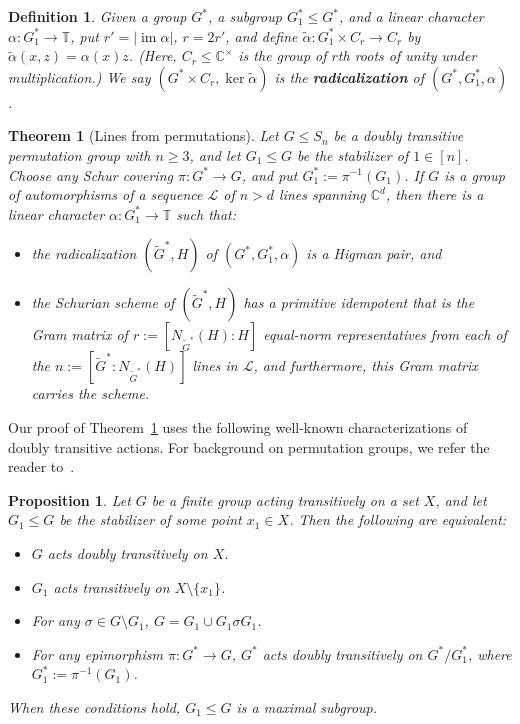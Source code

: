 \documentclass[11pt]{article}
\newtheorem{proposition}[theo]{Proposition}
\newtheorem{definition}[theo]{Definition}
\newtheorem{theorem}[theo]{Theorem}
\theoremstyle{definition}
\numberwithin{equation}{section}
\begin{document}
\begin{definition}
\label{defn:radicalization}
Given a group $G^*$, a subgroup $G^*_1 \leq G^*$, and a linear character $\alpha \colon G_1^* \to \mathbb{T}$, put $r' =|\operatorname{im}\alpha|$, $r=2r'$, and define $\widetilde{\alpha}\colon G^*_1 \times C_r\to C_r$ by $\widetilde{\alpha}(x,z)=\alpha(x)z$.
(Here, $C_r \leq \mathbb{C}^\times$ is the group of $r$th roots of unity under multiplication.)
We say $(G^*\times C_r,\operatorname{ker}\widetilde{\alpha})$ is the \textbf{radicalization} of $(G^*,G^*_1,\alpha)$.
\end{definition}


\begin{theorem}[Lines from permutations]
\label{thm.radicalization}
Let $G \leq S_n$ be a doubly transitive permutation group with $n \geq 3$, and let $G_1\leq G$ be the stabilizer of $1 \in [n]$.
Choose any Schur covering $\pi\colon G^* \to G$, and put $G^*_1:=\pi^{-1}(G_1)$.
If $G$ is a group of automorphisms of a sequence $\mathscr{L}$ of $n > d$ lines spanning $\mathbb{C}^d$, then there is a linear character $\alpha \colon G_1^* \to \mathbb{T}$ such that:
\begin{itemize}
\item[(a)]
the radicalization $(\widetilde{G}^*,H)$ of $(G^*,G^*_1,\alpha)$ is a Higman pair, and
\item[(b)]
the Schurian scheme of $(\widetilde{G}^*,H)$ has a primitive idempotent that is the Gram matrix of $r:=[N_{\widetilde{G}^*}(H):H]$ equal-norm representatives from each of the $n:=[\widetilde{G}^*:N_{\widetilde{G}^*}(H)]$ lines in $\mathscr{L}$, and furthermore, this Gram matrix carries the scheme.
\end{itemize}
\end{theorem}


Our proof of Theorem~\ref{thm.radicalization} uses the following well-known characterizations of doubly transitive actions.
For background on permutation groups, we refer the reader to~\cite{DixonMortimer:96}.

\begin{proposition}
\label{prop: char of 2tran}
Let $G$ be a finite group acting transitively on a set $X$, and let $G_1 \leq G$ be the stabilizer of some point $x_1 \in X$.
Then the following are equivalent:
\begin{itemize}
\item[(a)]
$G$ acts doubly transitively on $X$.
\item[(b)]
$G_1$ acts transitively on $X\setminus \{x_1\}$.
\item[(c)]
For any $\sigma \in G \setminus G_1$, $G = G_1 \cup G_1 \sigma G_1$.
\item[(d)]
For any epimorphism $\pi \colon G^* \to G$, $G^*$ acts doubly transitively on $G^*/G_1^*$, where $G_1^* := \pi^{-1}(G_1)$.
\end{itemize}
When these conditions hold, $G_1 \leq G$ is a maximal subgroup.
\end{proposition}
\end{document}
